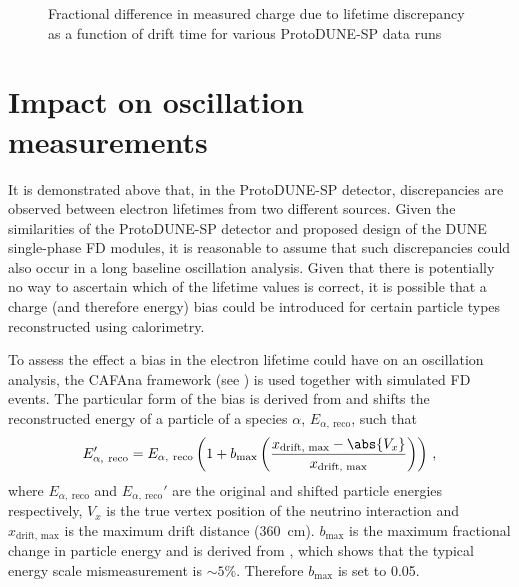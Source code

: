 \begin{figure}[h]
	\begin{adjustbox}{max totalsize=.6\linewidth, center}
		
	\end{adjustbox}
	\caption[Fractional difference in measured charge due to lifetime discrepancy as a function of drift time]{Fractional difference in measured charge due to lifetime discrepancy as a function of drift time for various ProtoDUNE-SP data runs}
	\label{fig:chargeEquivalent}
\end{figure}

\section{Impact on oscillation measurements}
\label{sec:pdune_calibration:osc}

It is demonstrated above that, in the ProtoDUNE-SP detector, discrepancies are observed between electron lifetimes from two different sources. 
Given the similarities of the ProtoDUNE-SP detector and proposed design of the DUNE single-phase FD modules, it is reasonable to assume that such discrepancies could also occur in a long baseline oscillation analysis.  
Given that there is potentially no way to ascertain which of the lifetime values is correct, it is possible that a charge (and therefore energy) bias could be introduced for certain particle types reconstructed using calorimetry.

To assess the effect a bias in the electron lifetime could have on an oscillation analysis, the CAFAna framework (see ) is used together with simulated FD events.
The particular form of the bias is derived from  and shifts the reconstructed energy of a particle of a species $\alpha$, $E_{\alpha,~\text{reco}}$, such that
\begin{equation}
	E_{\alpha,~\text{reco}}' = E_{\alpha,~\text{reco}} \left( 1 + b_{\text{max}} \left( \frac{ x_{\text{drift, max}} - \abs{V_{x}} }{ x_{\text{drift, max}} } \right) \right) \, ,
\end{equation}
where $E_{\alpha,~\text{reco}}$ and $E_{\alpha,~\text{reco}}'$ are the original and shifted particle energies respectively, $V_{x}$ is the true vertex position of the neutrino interaction and $x_{\text{drift, max}}$ is the maximum drift distance (\SI{360}{\cm}).
$b_{\text{max}}$ is the maximum fractional change in particle energy and is derived from , which shows that the typical energy scale mismeasurement is $\sim 5 \%$.
Therefore $b_{\text{max}}$ is set to \num{0.05}.

